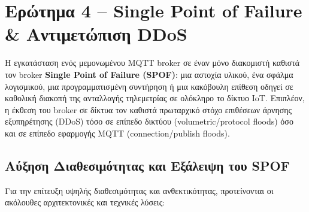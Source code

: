 \documentclass[11pt, a4paper]{article}
\begin{document}
\section{Ερώτημα 4 -- Single Point of Failure \& Αντιμετώπιση DDoS}

Η εγκατάσταση ενός μεμονωμένου MQTT broker σε έναν μόνο διακομιστή καθιστά τον broker \textbf{Single Point of Failure (SPOF)}: μια αστοχία υλικού, ένα σφάλμα λογισμικού, μια προγραμματισμένη συντήρηση ή μια κακόβουλη επίθεση οδηγεί σε καθολική διακοπή της ανταλλαγής τηλεμετρίας σε ολόκληρο το δίκτυο IoT. Επιπλέον, η έκθεση του broker σε δίκτυα τον καθιστά πρωταρχικό στόχο επιθέσεων άρνησης εξυπηρέτησης (DDoS) τόσο σε επίπεδο δικτύου (volumetric/protocol floods) όσο και σε επίπεδο εφαρμογής MQTT (connection/publish floods).

\subsection{Αύξηση Διαθεσιμότητας και Εξάλειψη του SPOF}
Για την επίτευξη υψηλής διαθεσιμότητας και ανθεκτικότητας, προτείνονται οι ακόλουθες αρχιτεκτονικές και τεχνικές λύσεις:
\end{document}
